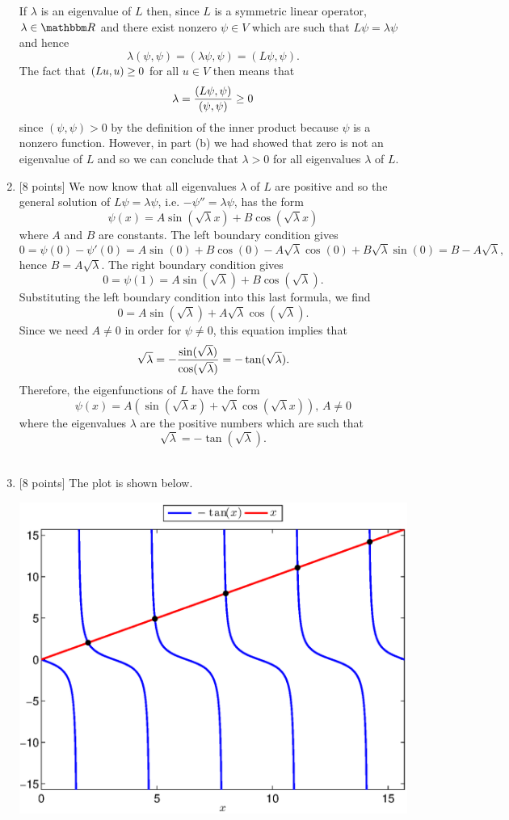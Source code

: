 \begin{solution}
\begin{enumerate}
If $\lambda$ is an eigenvalue of $L$ then, since $L$ is a symmetric linear operator, $\lambda\in\R$ and there exist nonzero $\psi\in V$ which are such that $L\psi=\lambda\psi$ and hence
\[
 \lambda(\psi,\psi) = ( \lambda\psi,\psi)= ( L\psi,\psi).
\]
The fact that $(Lu,u)\ge0$ for all $u\in V$ then means that
\[
 \lambda = {( L\psi,\psi) \over (\psi,\psi)}\ge0
\]
since $(\psi,\psi)>0$ by the definition of the inner product because $\psi$ is a nonzero function. However, in part (b) we had showed that zero is not an eigenvalue of $L$ and so we can conclude that $\lambda >0$ for all eigenvalues $\lambda$ of $L$.
\\
\item {[8 points]} We now know that all eigenvalues $\lambda$ of $L$ are positive and so the general solution of $L\psi = \lambda \psi$, i.e. $-\psi'' = \lambda \psi$, has the form
      \[
\psi(x) = A \sin(\sqrt{\lambda} x) + B \cos(\sqrt{\lambda} x)
\]
 where $A$ and $B$ are constants. The left boundary condition gives
      \[
0 = \psi(0) - \psi'(0) = A \sin(0) + B \cos(0)- A \sqrt{\lambda} \cos(0)+ B \sqrt{\lambda} \sin(0)= B - A \sqrt{\lambda},
\]
      hence $B = A \sqrt{\lambda}$.
      The right boundary condition gives
      \[
0 = \psi(1) = A \sin(\sqrt{\lambda}) + B \cos(\sqrt{\lambda}).
\]
      Substituting the left boundary condition into this last formula, we find
       \[ 
0 = A \sin(\sqrt{\lambda}) + A \sqrt{\lambda} \cos(\sqrt{\lambda}).
\]
Since we need $A\ne 0$ in order for $\psi\ne0$, this equation implies that
       \[ 
\sqrt{\lambda} = - {\sin(\sqrt{\lambda}) \over \cos(\sqrt{\lambda})}
                         = -\tan(\sqrt{\lambda}).
\]
Therefore, the eigenfunctions of $L$ have the form
\[
\psi(x) = A(\sin(\sqrt{\lambda} x) + \sqrt{\lambda}\cos(\sqrt{\lambda} x)),\, A\ne0
\]
where the eigenvalues $\lambda$ are the positive numbers which are such that
\[
\sqrt{\lambda} = -\tan(\sqrt{\lambda}).
\]
\\
\item {[8 points]} The plot is shown below.

\begin{center}
\includegraphics[scale=0.7]{eigroot}
\end{center}


\end{enumerate}
\end{solution}
